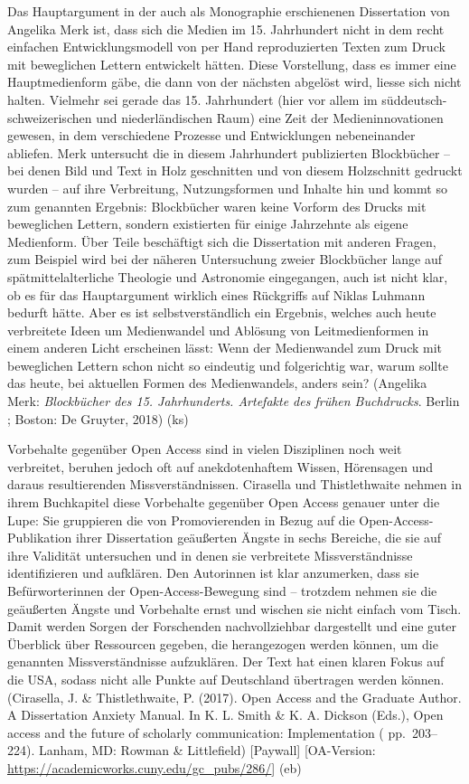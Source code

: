 \documentclass[a4paper,
fontsize=11pt,
oneside,
numbers=noperiodatend,
parskip=half-,
bibliography=totoc,
final
]{scrartcl}
\begin{document}
Das Hauptargument in der auch als Monographie erschienenen Dissertation
von Angelika Merk ist, dass sich die Medien im 15. Jahrhundert nicht in
dem recht einfachen Entwicklungsmodell von per Hand reproduzierten
Texten zum Druck mit beweglichen Lettern entwickelt hätten. Diese
Vorstellung, dass es immer eine Hauptmedienform gäbe, die dann von der
nächsten abgelöst wird, liesse sich nicht halten. Vielmehr sei gerade
das 15. Jahrhundert (hier vor allem im süddeutsch-schweizerischen und
niederländischen Raum) eine Zeit der Medieninnovationen gewesen, in dem
verschiedene Prozesse und Entwicklungen nebeneinander abliefen. Merk
untersucht die in diesem Jahrhundert publizierten Blockbücher -- bei
denen Bild und Text in Holz geschnitten und von diesem Holzschnitt
gedruckt wurden -- auf ihre Verbreitung, Nutzungsformen und Inhalte hin
und kommt so zum genannten Ergebnis: Blockbücher waren keine Vorform des
Drucks mit beweglichen Lettern, sondern existierten für einige
Jahrzehnte als eigene Medienform. Über Teile beschäftigt sich die
Dissertation mit anderen Fragen, zum Beispiel wird bei der näheren
Untersuchung zweier Blockbücher lange auf spätmittelalterliche Theologie
und Astronomie eingegangen, auch ist nicht klar, ob es für das
Hauptargument wirklich eines Rückgriffs auf Niklas Luhmann bedurft
hätte. Aber es ist selbstverständlich ein Ergebnis, welches auch heute
verbreitete Ideen um Medienwandel und Ablösung von Leitmedienformen in
einem anderen Licht erscheinen lässt: Wenn der Medienwandel zum Druck
mit beweglichen Lettern schon nicht so eindeutig und folgerichtig war,
warum sollte das heute, bei aktuellen Formen des Medienwandels, anders
sein? (Angelika Merk: \emph{Blockbücher des 15. Jahrhunderts. Artefakte
des frühen Buchdrucks}. Berlin ; Boston: De Gruyter, 2018) (ks)

Vorbehalte gegenüber Open Access sind in vielen Disziplinen noch weit
verbreitet, beruhen jedoch oft auf anekdotenhaftem Wissen, Hörensagen
und daraus resultierenden Missverständnissen. Cirasella und
Thistlethwaite nehmen in ihrem Buchkapitel diese Vorbehalte gegenüber
Open Access genauer unter die Lupe: Sie gruppieren die von
Promovierenden in Bezug auf die Open-Access-Publikation ihrer
Dissertation geäußerten Ängste in sechs Bereiche, die sie auf ihre
Validität untersuchen und in denen sie verbreitete Missverständnisse
identifizieren und aufklären. Den Autorinnen ist klar anzumerken, dass
sie Befürworterinnen der Open-Access-Bewegung sind -- trotzdem nehmen
sie die geäußerten Ängste und Vorbehalte ernst und wischen sie nicht
einfach vom Tisch. Damit werden Sorgen der Forschenden nachvollziehbar
dargestellt und eine guter Überblick über Ressourcen gegeben, die
herangezogen werden können, um die genannten Missverständnisse
aufzuklären. Der Text hat einen klaren Fokus auf die USA, sodass nicht
alle Punkte auf Deutschland übertragen werden können. (Cirasella, J. \&
Thistlethwaite, P. (2017). Open Access and the Graduate Author. A
Dissertation Anxiety Manual. In K. L. Smith \& K. A. Dickson (Eds.),
Open access and the future of scholarly communication: Implementation (
pp.~203--224). Lanham, MD: Rowman \& Littlefield) {[}Paywall{]}
{[}OA-Version: \url{https://academicworks.cuny.edu/gc_pubs/286/}{]} (eb)
\end{document}
